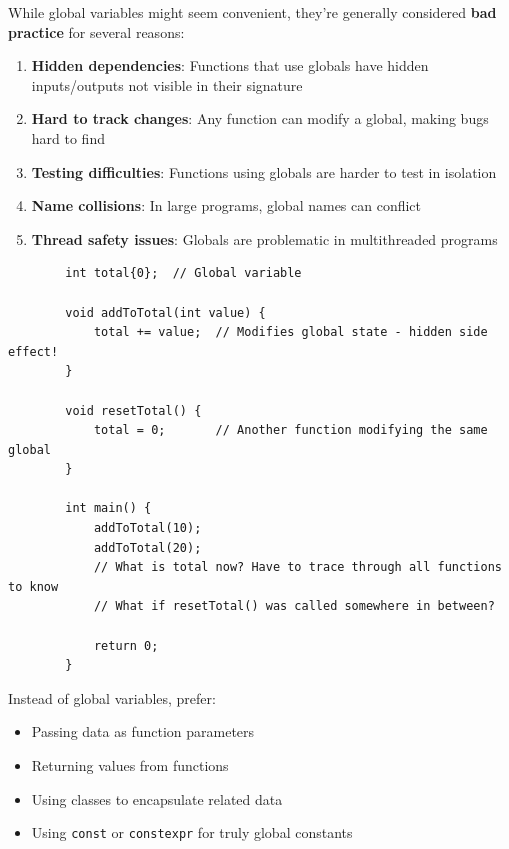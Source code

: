 While global variables might seem convenient, they're generally considered \textbf{bad practice} for several reasons:

\begin{enumerate}
	\item \textbf{Hidden dependencies}: Functions that use globals have hidden inputs/outputs not visible in their signature
	\item \textbf{Hard to track changes}: Any function can modify a global, making bugs hard to find
	\item \textbf{Testing difficulties}: Functions using globals are harder to test in isolation
	\item \textbf{Name collisions}: In large programs, global names can conflict
	\item \textbf{Thread safety issues}: Globals are problematic in multithreaded programs
\end{enumerate}

\begin{example}{\leavevmode}
	
	\begin{lstlisting}
		int total{0};  // Global variable
		
		void addToTotal(int value) {
			total += value;  // Modifies global state - hidden side effect!
		}
		
		void resetTotal() {
			total = 0;       // Another function modifying the same global
		}
		
		int main() {
			addToTotal(10);
			addToTotal(20);
			// What is total now? Have to trace through all functions to know
			// What if resetTotal() was called somewhere in between?
			
			return 0;
		}
	\end{lstlisting}
\end{example}

\begin{remark}
	Instead of global variables, prefer:
	\begin{itemize}
		\item Passing data as function parameters
		\item Returning values from functions
		\item Using classes to encapsulate related data
		\item Using \texttt{const} or \texttt{constexpr} for truly global constants
	\end{itemize}
\end{remark}

